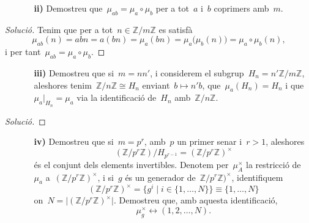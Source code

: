 \documentclass[a4paper]{article}
\newcommand{\ZZ}{\mathbb{Z}}
\newenvironment{solution}{
    \renewcommand\qedsymbol{\ensuremath{\lozenge}}
    \begin{proof}[Solució]
        }{
    \end{proof}
}
\begin{document}
\begin{enumerate}
    \item[] \begin{enumerate}
        \item[\textbf{ii)}] Demostreu que~\(\mu_{ab} = \mu_{a}\circ\mu_{b}\) per
            a tot~\(a\) i~\(b\) coprimers amb~\(m\).
    \end{enumerate}
\end{enumerate}

\begin{solution}
Tenim que per a tot~\(n\in\ZZ/m\ZZ\) es satisfà
\[
    \mu_{ab}(n)
    = abn
    = a(bn)
    = \mu_{a}(bn)
    = \mu_{a}\bigl(\mu_{b}(n)\bigr)
    = \mu_{a}\circ\mu_{b}(n),
\]
i per tant~\(\mu_{ab} = \mu_{a}\circ\mu_{b}\).
\end{solution}

\begin{enumerate}
    \item[] \begin{enumerate}
        \item[\textbf{iii)}] Demostreu que si~\(m=nn'\),
            i considerem el subgrup~\(H_{n}=n'\ZZ/m\ZZ\),
            aleshores tenim~\(\ZZ/n\ZZ \cong H_{n}\)
            enviant~\(b\mapsto n'b\),
            que~\(\mu_{a}(H_{n})=H_{n}\)
            i que~\(\mu_{a}\rvert_{H_{n}}=\mu_{a}\)
            via la identificació de~\(H_{n}\)
            amb~\(\ZZ/n\ZZ\).
    \end{enumerate}
\end{enumerate}

\begin{solution}
\end{solution}

\begin{enumerate}
    \item[] \begin{enumerate}
        \item[\textbf{iv)}] Demostreu que si~\(m=p^{r}\),
            amb~\(p\) un primer senar
            i~\(r>1\), aleshores
            \[
                (\ZZ/p^{r}\ZZ)/H_{p^{r-1}} = (\ZZ/p^{r}\ZZ)^{\times}
            \]
            és el conjunt dels elements invertibles.
            Denotem per~\(\mu_{A}^{\times}\)
            la restricció de~\(\mu_{a}\) a~\((\ZZ/p^{r}\ZZ)^{\times}\),
            i si~\(g\) és un generador de~\(\ZZ/p^{r}\ZZ)^{\times}\),
            identifiquem
            \[
                (\ZZ/p^{r}\ZZ)^{\times}
                =
                \{ g^{i} \mid i\in \{1,\dots,N\}\}
                \equiv
                \{1,\dots,N\}
            \]
            on~\(N = \lvert(\ZZ/p^{r}\ZZ)^{\times}\rvert\).
            Demostreu que, amb aquesta identificació,
            \[
                \mu_{g}^{\times} \leftrightarrow (1,2,\dots,N).
            \]
    \end{enumerate}
\end{enumerate}
\end{document}
